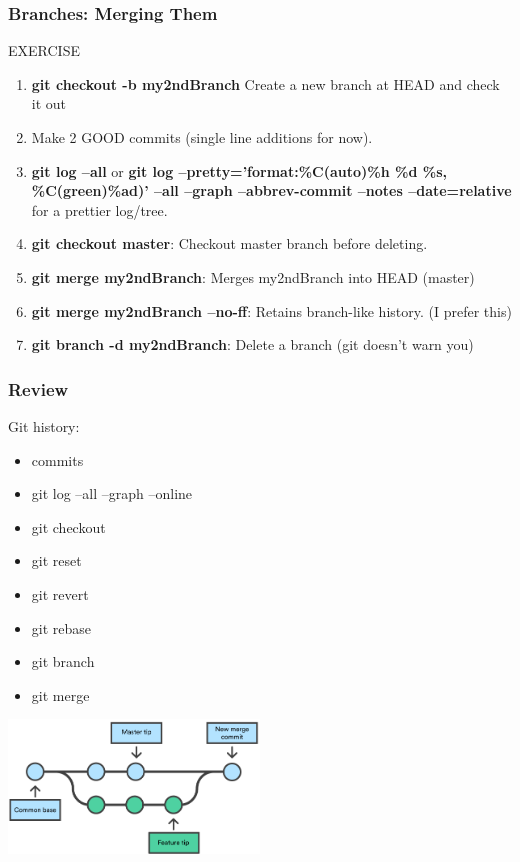 \documentclass{beamer}
\begin{document}
\begin{frame}[fragile]
	\frametitle{Branches: Merging Them}
	\begin{block}{EXERCISE}
		\begin{enumerate}
			\item \textbf{git checkout -b my2ndBranch } Create a new branch at HEAD and check it out
			\item Make 2 GOOD commits (single line additions for now).
			\item \textbf{git log --all} or \textbf{git log --pretty='format:\%C(auto)\%h \%d \%s, \%C(green)\%ad)' --all --graph --abbrev-commit --notes --date=relative} for a prettier log/tree.
			\item \textbf{git checkout master}: Checkout master branch before deleting.
			\item \textbf{git merge my2ndBranch}: Merges my2ndBranch into HEAD (master)
			\item \textbf{git merge my2ndBranch --no-ff}: Retains branch-like history. (I prefer this)
			\item \textbf{git branch -d my2ndBranch}: Delete a branch (git doesn't warn you)
		\end{enumerate}
	\end{block}
\end{frame}

\begin{frame}
	\frametitle{\textbf{Review}}
	Git history:
	\begin{itemize}
		\item commits
		\item git log --all --graph --online
		\item git checkout
		\item git reset
		\item git revert
		\item git rebase
		\item git branch
		\item git merge
	\end{itemize}
	\begin{center}
		\includegraphics[width=0.5\textwidth]{merge.png}
	\end{center}
\end{frame}	
\end{document}
